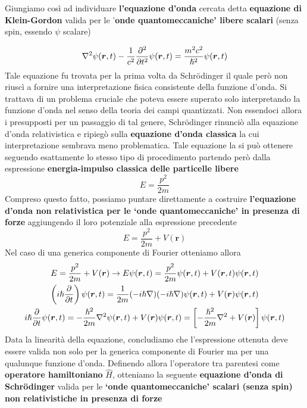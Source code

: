Giungiamo così ad individuare \textbf{l'equazione d'onda} cercata detta
\textbf{equazione di Klein-Gordon} valida per le '\textbf{onde
quantomeccaniche' libere scalari} (senza spin, essendo \(\psi\) scalare)

\begin{equation}
	\nabla^2 \psi(\bm{r},t) - \frac{1}{c^2}\frac{\partial^2}{\partial t^2}\psi(\bm{r},t) =
	\frac{m^2c^2}{\hp^2}\psi(\bm{r},t)
	\label{eq:klein-gordon}
\end{equation}
Tale equazione fu trovata per la prima volta da Schrödinger il quale
però non riuscì a fornire una interpretazione fisica consistente della
funzione d'onda.
Si trattava di un problema cruciale che poteva essere
superato solo interpretando la funzione d'onda nel senso della teoria
dei campi quantizzati.
Non essendoci allora i presupposti per
un passaggio di tal genere, Schrödinger rinunciò alla equazione d'onda
relativistica e ripiegò sulla \textbf{equazione d'onda classica} la cui
interpretazione sembrava meno problematica.
Tale equazione la si può
ottenere seguendo esattamente lo stesso tipo di procedimento partendo
però dalla espressione \textbf{energia-impulso classica delle particelle libere}
\[
	E = \frac{p^2}{2m}
\]
Compreso questo fatto, possiamo puntare direttamente a costruire
\textbf{l'equazione d'onda non relativistica per le `onde
quantomeccaniche' in presenza di forze} aggiungendo il loro potenziale
alla espressione precedente
\[
	E = \frac{p^2}{2m} + V(\bm{r})
\]
Nel caso di una generica componente di Fourier otteniamo allora
\begin{gather*}
	E = \frac{p^2}{2m} + V(\bm{r}) \rightarrow E \psi(\bm{r},t) = \frac{p^2}{2m}\psi(\bm{r},t) +
	V(\bm{r},t)\psi(\bm{r},t)\\
	\left( i \hslash \frac{\partial}{\partial t} \right)\psi(\bm{r},t) = \frac{1}{2m}(- i \hslash \nabla)(- i \hslash \nabla)\psi(\bm{r},t) + V(\bm{r})\psi(\bm{r},t)\\
	i \hslash \frac{\partial}{\partial t} \psi(\bm{r},t) = - \frac{\hslash^2}{2m}\nabla^2\psi(\bm{r},t)+
	V(\bm{r})\psi(\bm{r},t) = \left[ - \frac{\hslash^2}{2m}\nabla^2 + V(\bm{r})\right] \psi(\bm{r},t)
\end{gather*}
Data la linearità della equazione, concludiamo che l'espressione
ottenuta deve essere valida non solo per la generica componente di
Fourier ma per una qualunque funzione d'onda.
Definendo allora
l'operatore tra parentesi come \textbf{operatore hamiltoniano}
\(\hat{H}\), otteniamo la seguente \textbf{equazione d'onda di
Schrödinger} valida per le \textbf{`onde quantomeccaniche' scalari (senza spin) non relativistiche in presenza di forze}
